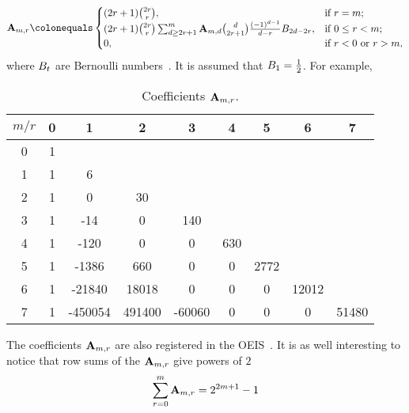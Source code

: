 \begin{equation}
    \label{eq:definition_coefficient_a}
    \coeffA{m}{r} \colonequals
    \begin{cases}
    (2r+1)
        \binom{2r}{r}, & \text{if } r=m; \\
        (2r+1) \binom{2r}{r} \sum_{d \geq 2r+1}^{m} \coeffA{m}{d} \binom{d}{2r+1} \frac{(-1)^{d-1}}{d-r}
        \bernoulli{2d-2r}, & \text{if } 0 \leq r<m; \\
        0, & \text{if } r<0 \text{ or } r>m,
    \end{cases}
\end{equation}
where ${B}\sb{t}$ are Bernoulli numbers~\cite{bateman1953higher}.
It is assumed that ${B}\sb{1}=\frac{1}{2}$.
For example,
\begin{table}[H]
    \begin{center}
        \setlength\extrarowheight{-6pt}
        \begin{tabular}{c|cccccccc}
            $m/r$ & 0 & 1       & 2      & 3      & 4   & 5    & 6     & 7 \\ [3px]
            \hline
            0     & 1 &         &        &        &     &      &       &       \\
            1     & 1 & 6       &        &        &     &      &       &       \\
            2     & 1 & 0       & 30     &        &     &      &       &       \\
            3     & 1 & -14     & 0      & 140    &     &      &       &       \\
            4     & 1 & -120    & 0      & 0      & 630 &      &       &       \\
            5     & 1 & -1386   & 660    & 0      & 0   & 2772 &       &       \\
            6     & 1 & -21840  & 18018  & 0      & 0   & 0    & 12012 &       \\
            7     & 1 & -450054 & 491400 & -60060 & 0   & 0    & 0     & 51480
        \end{tabular}
    \end{center}
    \caption{Coefficients ${\mathbf{A}} \sb{m,r}$.}
    \label{tab:table_of_coefficients_a}
\end{table}
The coefficients ${\mathbf{A}} \sb{m,r}$ are also registered in the OEIS~\cite{kolosov2018numerator,kolosov2018denominator}.
It is as well interesting to notice that row sums of the ${\mathbf{A}} \sb{m,r}$ give powers of $2$
\begin{equation*}
    \sum_{r=0}^{m} {\mathbf{A}} \sb{m,r} = 2^{2m+1} - 1
\end{equation*}
